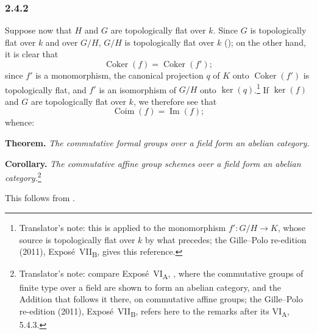 
\subsubsection*{2.4.2}
\label{sga3:VIIB:2.4.2}

Suppose now that \(H\) and \(G\) are topologically flat over \(k\).
Since \(G\) is topologically flat over \(k\) and over \(G/H\), \(G/H\)
is topologically flat over \(k\) \textup{()}; on the other hand, it
is clear that
\[
  \operatorname{Coker}(f)
  =
  \operatorname{Coker}(f');
\]
since \(f'\) is a monomorphism, the canonical projection \(q\) of \(K\)
onto \(\operatorname{Coker}(f')\) is topologically flat, and \(f'\) is
an isomorphism of \(G/H\) onto \(\ker(q)\).\footnote{Translator's note: this is
 applied to the monomorphism \(f'\colon G/H\to K\), whose source is topologically
flat over \(k\) by what precedes; the Gille--Polo re-edition (2011), Expos\'e~VII\textsubscript{B}, gives
this reference.} If \(\ker(f)\) and \(G\) are
topologically flat over \(k\), we therefore see that
\[
  \operatorname{Coim}(f)=\operatorname{Im}(f);
\]
whence:

\medskip
\noindent\textbf{Theorem.}
\label{sga3:VIIB:2.4.2:theorem}
{\itshape The commutative formal groups over a field form an abelian
category.}

\medskip
\noindent\textbf{Corollary.}
\label{sga3:VIIB:2.4.2:corollary}
{\itshape The commutative affine group schemes over a field form an
abelian category.}\footnote{Translator's note: compare Expos\'e~VI\textsubscript{A},
, where the commutative groups of finite type over a field are shown to form an
abelian category, and the Addition that follows it there, on commutative affine groups; the Gille--Polo
re-edition (2011), Expos\'e~VII\textsubscript{B}, refers here to the remarks after its VI\textsubscript{A}, 5.4.3.}

This follows from .
